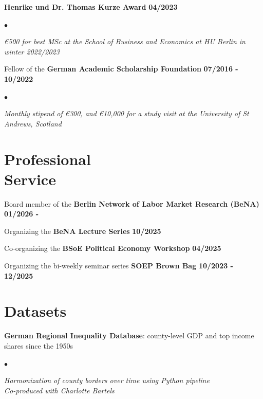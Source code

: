 \documentclass[margin, line]{res}
\newlength{\secvspace}
\newlength{\linevspace}
\newlength{\listvspace}
\newenvironment{list2}{
  \begin{list}{$\bullet$}{%
      \setlength{\itemsep}{0in}
      \setlength{\parsep}{0in} \setlength{\parskip}{0in}
      \setlength{\topsep}{0in} \setlength{\partopsep}{0in}
      \setlength{\leftmargin}{0.2in}}}{\end{list}}
\begin{document}
\begin{resume}
\textbf{Henrike und Dr. Thomas Kurze Award} \hfill{\bf 04/2023}\\
\vspace*{\listvspace}
\begin{list2}
    \item[] \textit{\euro 500 for best MSc at the School of Business and Economics at HU Berlin in winter 2022/2023}
\end{list2}
\vspace*{\listvspace}

Fellow of the \textbf{German Academic Scholarship Foundation} \hfill {\bf 07/2016 - 10/2022}\\
\vspace*{\listvspace}
\begin{list2}
    \item[] \textit{Monthly stipend of \euro 300, and \euro 10,000 for a study visit at the University of St Andrews, Scotland}
\end{list2}
\vspace*{\secvspace}

\section{ Professional \\ Service}
Board member of the \textbf{Berlin Network of Labor Market Research (BeNA)} \hfill{\bf 01/2026 - \hspace{1.35cm}} \\
\vspace*{\linevspace}

Organizing the \textbf{BeNA Lecture Series} \hfill{\bf 10/2025} \\
\vspace*{\linevspace}

Co-organizing the \textbf{BSoE Political Economy Workshop}  \hfill{\bf 04/2025} \\
\vspace*{\linevspace}

Organizing the bi-weekly seminar series \textbf{SOEP Brown Bag} \hfill{\bf 10/2023 - 12/2025} \\
\vspace*{\secvspace}

\clearpage

\section{Datasets}
\textbf{German Regional Inequality Database}: county-level GDP and top income shares since the 1950s \\
\vspace*{\listvspace}
\begin{list2}
\item[] \textit{Harmonization of county borders over time using Python pipeline} \\
\textit{Co-produced with Charlotte Bartels}
\end{list2}
\vspace{\listvspace}


\end{resume}
\end{document}
